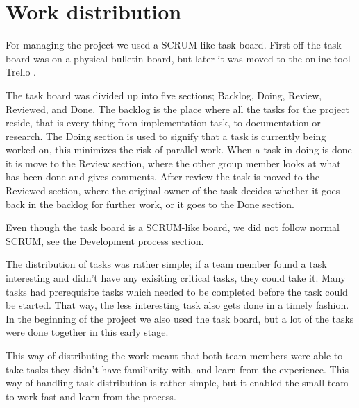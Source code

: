 

\chapter{Work distribution}
For managing the project we used a SCRUM-like task board. First off the task board was on a physical bulletin board, but later it was moved to the online tool Trello \cite{trello}. 

The task board was divided up into five sections; Backlog, Doing, Review, Reviewed, and Done. The backlog is the place where all the tasks for the project reside, that is every thing from implementation task, to documentation or research. The Doing section is used to signify that a task is currently being worked on, this minimizes the risk of parallel work. When a task in doing is done it is move to the Review section, where the other group member looks at what has been done and gives comments. After review the task is moved to the Reviewed section, where the original owner of the task decides whether it goes back in the backlog for further work, or it goes to the Done section.

Even though the task board is a SCRUM-like board, we did not follow normal SCRUM, see the Development process section.

The distribution of tasks was rather simple; if a team member found a task interesting and didn't have any exisiting critical tasks, they could take it. Many tasks had prerequisite tasks which needed to be completed before the task could be started. That way, the less interesting task also gets done in a timely fashion. In the beginning of the project we also used the task board, but a lot of the tasks were done together in this early stage. 

This way of distributing the work meant that both team members were able to take tasks they didn't have familiarity with, and learn from the experience. This way of handling task distribution is rather simple, but it enabled the small team to work fast and learn from the process.